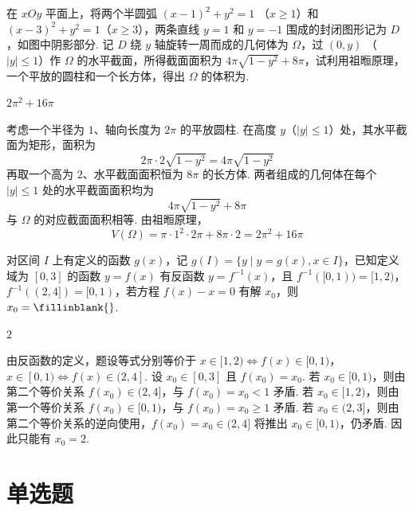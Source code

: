 \begin{problem}
在 \(xOy\) 平面上，将两个半圆弧 \((x-1)^2+y^2=1\) （\(x\geqslant 1\)）和 \((x-3)^2+y^2=1\)（\(x\geqslant 3\)），两条直线 \(y=1\) 和 \(y=-1\) 围成的封闭图形记为 \(D\)，如图中阴影部分. 记 \(D\) 绕 \(y\) 轴旋转一周而成的几何体为 \(\Omega\)，过 \((0,y)\) （\(|y|\leqslant 1\)）作 \(\Omega\) 的水平截面，所得截面面积为 \(4\pi\sqrt{1-y^2}+8\pi\)，试利用祖暅原理，一个平放的圆柱和一个长方体，得出 \(\Omega\) 的体积为\fillinblank{}.
\begin{answer}
\(2\pi^2+16\pi\)
\end{answer}

\begin{solution}
考虑一个半径为 \(1\)、轴向长度为 \(2\pi\) 的平放圆柱. 在高度 \(y\)（\(|y|\leqslant1\)）处，其水平截面为矩形，面积为
\[
2\pi\cdot2\sqrt{1-y^2}=4\pi\sqrt{1-y^2}
\]
再取一个高为 \(2\)、水平截面面积恒为 \(8\pi\) 的长方体. 两者组成的几何体在每个 \(|y|\leqslant1\) 处的水平截面面积均为
\[
4\pi\sqrt{1-y^2}+8\pi
\]
与 \(\Omega\) 的对应截面面积相等. 由祖暅原理，
\[
V(\Omega)=\pi\cdot1^2\cdot2\pi+8\pi\cdot2=2\pi^2+16\pi
\]
\end{solution}
\end{problem}

\begin{problem}
对区间 \(I\) 上有定义的函数 \(g(x)\)，记 \(g(I)=\{y\mid y=g(x),x\in I\}\)，已知定义域为 \([0,3]\) 的函数 \(y=f(x)\) 有反函数 \(y=f^{-1}(x)\)，且 \(f^{-1}([0,1))=[1,2)\)，\(f^{-1}((2,4])=[0,1)\)，若方程 \(f(x)-x=0\) 有解 \(x_0\)，则 \(x_0=\fillinblank{}\).
\begin{answer}
\(2\)
\end{answer}

\begin{solution}
由反函数的定义，题设等式分别等价于
\(x\in[1,2)\Longleftrightarrow f(x)\in[0,1)\)，\(x\in[0,1)\Longleftrightarrow f(x)\in(2,4]\).
设 \(x_0\in[0,3]\) 且 \(f(x_0)=x_0\). 若 \(x_0\in[0,1)\)，则由第二个等价关系 \(f(x_0)\in(2,4]\)，与 \(f(x_0)=x_0<1\) 矛盾. 若 \(x_0\in[1,2)\)，则由第一个等价关系 \(f(x_0)\in[0,1)\)，与 \(f(x_0)=x_0\geqslant1\) 矛盾. 若 \(x_0\in(2,3]\)，则由第二个等价关系的逆向使用，\(f(x_0)=x_0\in(2,4]\) 将推出 \(x_0\in[0,1)\)，仍矛盾. 因此只能有 \(x_0=2\).
\end{solution}
\end{problem}

\section{单选题}

